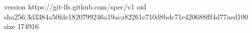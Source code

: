 version https://git-lfs.github.com/spec/v1
oid sha256:3d3384a50fde1820799246a19aca82261e710d8bdc71e420688fff4d77aed100
size 174916
